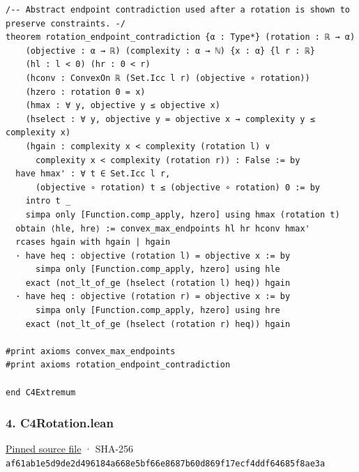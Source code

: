 \documentclass[11pt,a4paper]{article}
\begin{document}
\begin{Verbatim}[breaklines,breakanywhere,fontsize=\footnotesize]
/-- Abstract endpoint contradiction used after a rotation is shown to preserve constraints. -/
theorem rotation_endpoint_contradiction {α : Type*} (rotation : ℝ → α)
    (objective : α → ℝ) (complexity : α → ℕ) {x : α} {l r : ℝ}
    (hl : l < 0) (hr : 0 < r)
    (hconv : ConvexOn ℝ (Set.Icc l r) (objective ∘ rotation))
    (hzero : rotation 0 = x)
    (hmax : ∀ y, objective y ≤ objective x)
    (hselect : ∀ y, objective y = objective x → complexity y ≤ complexity x)
    (hgain : complexity x < complexity (rotation l) ∨
      complexity x < complexity (rotation r)) : False := by
  have hmax' : ∀ t ∈ Set.Icc l r,
      (objective ∘ rotation) t ≤ (objective ∘ rotation) 0 := by
    intro t _
    simpa only [Function.comp_apply, hzero] using hmax (rotation t)
  obtain ⟨hle, hre⟩ := convex_max_endpoints hl hr hconv hmax'
  rcases hgain with hgain | hgain
  · have heq : objective (rotation l) = objective x := by
      simpa only [Function.comp_apply, hzero] using hle
    exact (not_lt_of_ge (hselect (rotation l) heq)) hgain
  · have heq : objective (rotation r) = objective x := by
      simpa only [Function.comp_apply, hzero] using hre
    exact (not_lt_of_ge (hselect (rotation r) heq)) hgain

#print axioms convex_max_endpoints
#print axioms rotation_endpoint_contradiction

end C4Extremum
\end{Verbatim}

\subsubsection{4. C4Rotation.lean}\label{c4rotation.lean}

\href{https://github.com/mpelteshki/climbing-to-the-frontier/blob/29fbb70da18564048f62492e43870f2f96a65463/cagent/p1/C4Rotation.lean}{Pinned source file} · SHA-256 \texttt{af61ab1e\allowbreak{}5d9de2d4\allowbreak{}96184a66\allowbreak{}8e5bf66e\allowbreak{}8687b60d\allowbreak{}869f17ec\allowbreak{}f4ddf646\allowbreak{}85f8ae3a}
\end{document}
